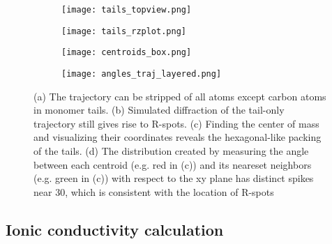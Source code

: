 \begin{figure}[H]
	\centering
	\begin{subfigure}{0.45\textwidth}
		\centering
		\hspace{-1cm}
		\vspace{1cm}
		\texttt{[image: tails\_topview.png]}
		\caption{}\label{fig:tails_topview}
	\end{subfigure}
	\begin{subfigure}{0.45\textwidth}
		\centering
		\texttt{[image: tails\_rzplot.png]}
		\caption{}\label{fig:tails_rzplot}
	\end{subfigure}
	\begin{subfigure}{0.45\textwidth}
		\centering
		\texttt{[image: centroids\_box.png]}
		\caption{}\label{fig:centroids}
	\end{subfigure}
	\begin{subfigure}{0.45\textwidth}
		\centering
		\texttt{[image: angles\_traj\_layered.png]}
		\caption{}\label{fig:angle_distribution}
	\end{subfigure}
	\caption{(a) The trajectory can be stripped of all atoms except carbon
	atoms in monomer tails. (b) Simulated diffraction of the tail-only trajectory
	still gives rise to R-spots. (c) Finding the center of mass and visualizing 
	their coordinates reveals the hexagonal-like packing of the tails. (d) The 
	distribution created by measuring the angle between each centroid (e.g. red 
	in (c)) and its neareset neighbors (e.g. green in (c)) with respect to the xy
	plane has distinct spikes near 30\degree, which is consistent with the location
	of R-spots}\label{fig:tail_packing}
\end{figure}

\subsection*{Ionic conductivity calculation}

